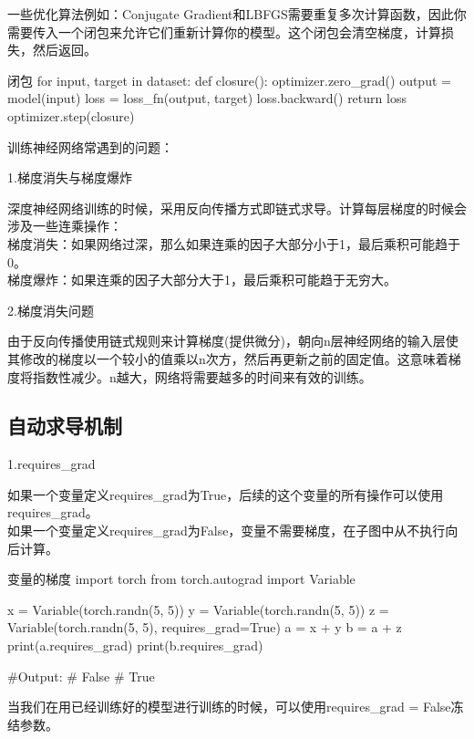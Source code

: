 \documentclass[openbib]{article}
\begin{document}
一些优化算法例如：Conjugate Gradient和LBFGS需要重复多次计算函数，因此你需要传入一个闭包来允许它们重新计算你的模型。这个闭包会清空梯度，计算损失，然后返回。
\begin{Python}{闭包}
	for input, target in dataset:
	def closure():
	optimizer.zero_grad()
	output = model(input)
	loss = loss_fn(output, target)
	loss.backward()
	return loss
	optimizer.step(closure)
\end{Python}



训练神经网络常遇到的问题：
\begin{center}
	1.梯度消失与梯度爆炸
\end{center}

深度神经网络训练的时候，采用反向传播方式即链式求导。计算每层梯度的时候会涉及一些连乘操作：
\\梯度消失：如果网络过深，那么如果连乘的因子大部分小于1，最后乘积可能趋于0。
\\梯度爆炸：如果连乘的因子大部分大于1，最后乘积可能趋于无穷大。

\begin{center}
	2.梯度消失问题
\end{center}

由于反向传播使用链式规则来计算梯度(提供微分)，朝向n层神经网络的输入层使其修改的梯度以一个较小的值乘以n次方，然后再更新之前的固定值。这意味着梯度将指数性减少。n越大，网络将需要越多的时间来有效的训练。

\subsection{自动求导机制}
\begin{center}
	1.requires\_grad
\end{center}
如果一个变量定义requires\_grad为True，后续的这个变量的所有操作可以使用requires\_grad。
\\如果一个变量定义requires\_grad为False，变量不需要梯度，在子图中从不执行向后计算。
\begin{Python}{变量的梯度}
	import torch
	from torch.autograd import Variable
	
	x = Variable(torch.randn(5, 5))
	y = Variable(torch.randn(5, 5))
	z = Variable(torch.randn(5, 5), requires_grad=True)
	a = x + y
	b = a + z
	print(a.requires_grad)
	print(b.requires_grad)
	
	#Output:
	#       False
	#       True
\end{Python}

当我们在用已经训练好的模型进行训练的时候，可以使用requires\_grad = False冻结参数。
\end{document}
